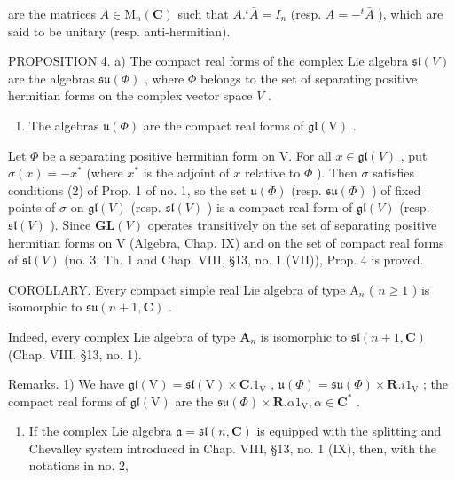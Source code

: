 are the matrices \(A \in \mathrm{M}_{n}(\mathbf{C})\) such that \(A.^{t}\bar{A} = I_{n}\) (resp. \(A = -^{t}\bar{A}\) ), which are said to be unitary (resp. anti-hermitian).

PROPOSITION 4. a) The compact real forms of the complex Lie algebra \(\mathfrak{sl}(V)\) are the algebras \(\mathfrak{su}(\Phi)\) , where \(\Phi\) belongs to the set of separating positive hermitian forms on the complex vector space \(V\) .

\begin{enumerate}
\def\labelenumi{\alph{enumi})}
\setcounter{enumi}{1}
\tightlist
\item
  The algebras \(\mathfrak{u}(\varPhi)\) are the compact real forms of \(\mathfrak{gl}(\mathrm{V})\) .
\end{enumerate}

Let \(\varPhi\) be a separating positive hermitian form on V. For all \(x\in\mathfrak{gl}(V)\) , put \(\sigma(x)=-x^{*}\) (where \(x^{*}\) is the adjoint of \(x\) relative to \(\varPhi\) ). Then \(\sigma\) satisfies conditions (2) of Prop. 1 of no. 1, so the set \(\mathfrak{u}(\varPhi)\) (resp. \(\mathfrak{su}(\varPhi)\) ) of fixed points of \(\sigma\) on \(\mathfrak{gl}(V)\) (resp. \(\mathfrak{sl}(V)\) ) is a compact real form of \(\mathfrak{gl}(V)\) (resp. \(\mathfrak{sl}(V)\) ). Since \(\mathbf{GL}(V)\) operates transitively on the set of separating positive hermitian forms on V (Algebra, Chap. IX) and on the set of compact real forms of \(\mathfrak{sl}(V)\) (no. 3, Th. 1 and Chap. VIII, §13, no. 1 (VII)), Prop. 4 is proved.

COROLLARY. Every compact simple real Lie algebra of type \(\mathrm{A}_n\) ( \(n \geq 1\) ) is isomorphic to \(\mathfrak{su}(n + 1, \mathbf{C})\) .

Indeed, every complex Lie algebra of type \(\mathbf{A}_n\) is isomorphic to \(\mathfrak{sl}(n + 1,\mathbf{C})\) (Chap. VIII, §13, no. 1).

Remarks. 1) We have \(\mathfrak{gl}(\mathrm{V}) = \mathfrak{sl}(\mathrm{V}) \times \mathbf{C}.1_{\mathrm{V}}\) , \(\mathfrak{u}(\varPhi) = \mathfrak{su}(\varPhi) \times \mathbf{R}.i1_{\mathrm{V}}\) ; the compact real forms of \(\mathfrak{gl}(\mathrm{V})\) are the \(\mathfrak{su}(\varPhi) \times \mathbf{R}. \alpha 1_{\mathrm{V}}, \alpha \in \mathbf{C}^*\) .

\begin{enumerate}
\def\labelenumi{\arabic{enumi})}
\setcounter{enumi}{1}
\tightlist
\item
  If the complex Lie algebra \(\mathfrak{a} = \mathfrak{sl}(n,\mathbf{C})\) is equipped with the splitting and Chevalley system introduced in Chap. VIII, §13, no. 1 (IX), then, with the notations in no. 2,
\end{enumerate}

